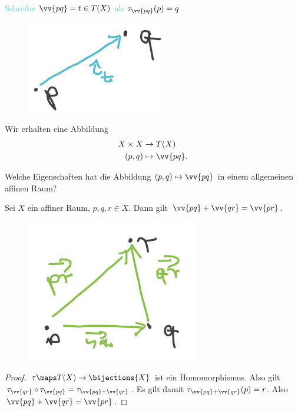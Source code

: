 \textcolor{Turquoise}{Schreibe \( \vv{pq}=t\in T(X) \) als \( \tau_{\vv{pq}}(p)=q \).}
\begin{figure}[H]
    \centering
    \includegraphics[width=0.2\linewidth]{figures/vektornotation}
    \label{fig:vektornotation}
\end{figure}
Wir erhalten eine Abbildung
\begin{align*}
    X\times X&\to T(X)\\
    (p,q)&\mapsto \vv{pq}.
\end{align*}
\begin{frage*}
    Welche Eigenschaften hat die Abbildung \( (p,q)\mapsto \vv{pq} \) in einem allgemeinen affinen Raum?
\end{frage*}
\begin{lemma}\label{vektoren_funzen_richtig}
    Sei \( X \) ein affiner Raum, \( p,q,r\in X \). Dann gilt \( \vv{pq}+\vv{qr}=\vv{pr} \).
\end{lemma}
\begin{figure}[H]
    \centering
    \includegraphics[width=0.3\linewidth]{figures/vektoren_funzen_richtig}
    \label{fig:vektoren_funzen_richtig}
\end{figure}
\begin{proof}
    \( \tau\maps T(X)\to \bijections{X} \) ist ein Homomorphismus. 
    Also gilt \( \tau_{\vv{qr}}\circ \tau_{\vv{pq}}=\tau_{\vv{pq}+\vv{qr}} \). 
    Es gilt damit \( \tau_{\vv{pq}+\vv{qr}}(p)=r \). 
    Also \( \vv{pq}+\vv{qr}=\vv{pr} \).    
\end{proof}


